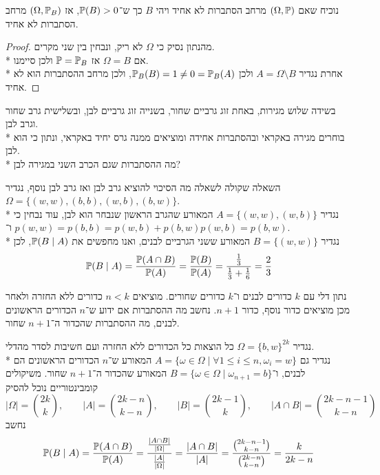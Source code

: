 \Subquestion{}
נוכיח שאם $(\Omega, \mathbb{P})$ מרחב הסתברות לא אחיד ויהי $B$ כך ש־$\mathbb{P}(B) > 0$, אז $(\Omega, \mathbb{P}_B)$ מרחב הסתברות לא אחיד.
\begin{proof}
	מהנתון נסיק כי $\Omega$ לא ריק, ונבחין בין שני מקרים. \\*
	אם $\Omega = B$ אז $\mathbb{P} = \mathbb{P}_B$ ולכן סיימנו. \\*
	אחרת נגדיר $A = \Omega \setminus B$ ולכן $\mathbb{P}_B(B) = 1 \ne 0 = \mathbb{P}_B(A)$, ולכן מרחב ההסתברות הוא לא אחיד.
\end{proof}

\Question{}
\Subquestion{}
בשידה שלוש מגירות, באחת זוג גרביים שחור, בשנייה זוג גרביים לבן, ובשלישית גרב שחור וגרב לבן. \\*
בוחרים מגירה באקראי ובהסתברות אחידה ומוציאים ממנה גרס יחיד באקראי, ונתון כי הוא לבן. \\*
מה ההסתברות שגם הכרב השני במגירה לבן?
\begin{solution}
	השאלה שקולה לשאלה מה הסיכוי להוציא גרב לבן ואז גרב לבן נוסף, נגדיר $\Omega = \{ (w, w), (b, b), (w, b), (b, w) \}$. \\*
	נגדיר $A = \{ (w, w), (w, b) \}$ המאורע שהגרב הראשון שנבחר הוא לבן, עוד נבחין כי $p(w, w) = p(b, b) = p(w, b) + p(b, w)$ ו־$p(w, b) = p(b, w)$. \\*
	נגדיר $B = \{ (w, w) \}$ המאורע ששני הגרביים לבנים, ואנו מחפשים את $\mathbb{P}(B \mid A)$, לכן
	\[
		\mathbb{P}(B \mid A) = \frac{\mathbb{P}(A \cap B)}{\mathbb{P}(A)} = \frac{\mathbb{P}(B)}{\mathbb{P}(A)} = \frac{\frac{1}{3}}{\frac{1}{3} + \frac{1}{6}} = \frac{2}{3}
	\]
\end{solution}

\Subquestion{}
נתון דלי עם $k$ כדורים לבנים ו־$k$ כדורים שחורים.
מוציאים $n < k$ כדורים ללא החזרה ולאחר מכן מוציאים כדור נוסף, כדור $n + 1$.
נחשב מה ההסתברות אם ידוע ש־$n$ הכדורים הראשונים לבנים, מה ההסתברות שהכדור ה־$n + 1$ שחור.
\begin{solution}
	נגדיר $\Omega = {\{b, w\}}^{2k}$ כל הוצאות כל הכדורים ללא החזרה ועם חשיבות לסדר מהדלי. \\*
	נגדיר גם $A = \{ \omega \in \Omega \mid \forall 1 \le i \le n, \omega_i = w \}$ המאורע ש־$n$ הכדורים הראשונים הם לבנים,
	ו־$B = \{ \omega \in \Omega \mid \omega_{n + 1} = b \}$ המאורע שהכדור ה־$n + 1$ שחור. משיקולים קומבינטוריים נוכל להסיק
	\[
		|\Omega| = \binom{2k}{k},
		\qquad
		|A| = \binom{2k - n}{k - n},
		\qquad
		|B| = \binom{2k - 1}{k},
		\qquad
		|A \cap B| = \binom{2k - n - 1}{k - n}
	\]
	נחשב
	\[
		\mathbb{P}(B \mid A)
		= \frac{\mathbb{P}(A \cap B)}{\mathbb{P}(A)}
		= \frac{\frac{|A \cap B|}{|\Omega|}}{\frac{|A|}{|\Omega|}}
		= \frac{|A \cap B|}{|A|}
		= \frac{\binom{2k - n - 1}{k - n}}{\binom{2k - n}{k - n}}
		= \frac{k}{2k - n}
	\]
\end{solution}

